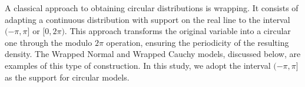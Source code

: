 \documentclass[remotesensing,article,submit,pdftex,moreauthors]{Definitions/mdpi}
\begin{document}
A classical approach to obtaining circular distributions is wrapping.
It consists of adapting a continuous distribution with support on the real line to the interval $(-\pi, \pi]$ or $[0, 2\pi)$. 
This approach transforms the original variable into a circular one through the modulo $2\pi$ operation, ensuring the periodicity of the resulting density. 
The Wrapped Normal and Wrapped Cauchy models, discussed below, are examples of this type of construction. 
In this study, we adopt the interval $(-\pi, \pi]$ as the support for circular models. 


%
%
%
\end{document}
